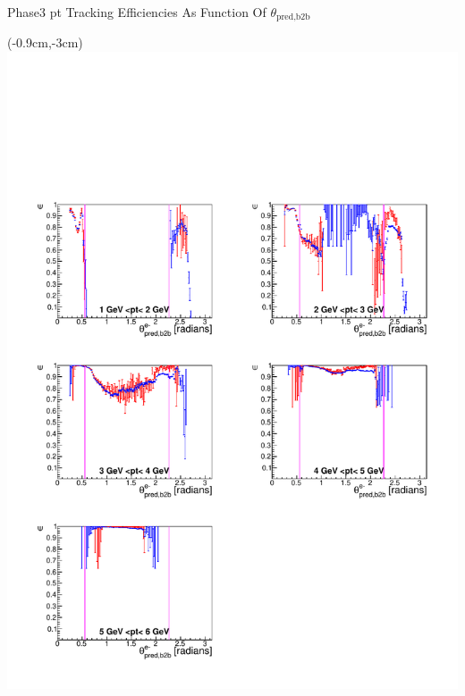 \documentclass[8pt]{beamer}
\begin{document}
\begin{frame}{Phase3 pt Tracking Efficiencies As Function Of $\theta_{\textrm{pred,b2b}}$}
	
	
	\begin{textblock*}{6.5cm}(-0.9cm,-3cm)
		\includegraphics[width=\textwidth]{VPlots/P3/xPtMThetaemP3}
	\end{textblock*}
	

\end{frame}
\end{document}
